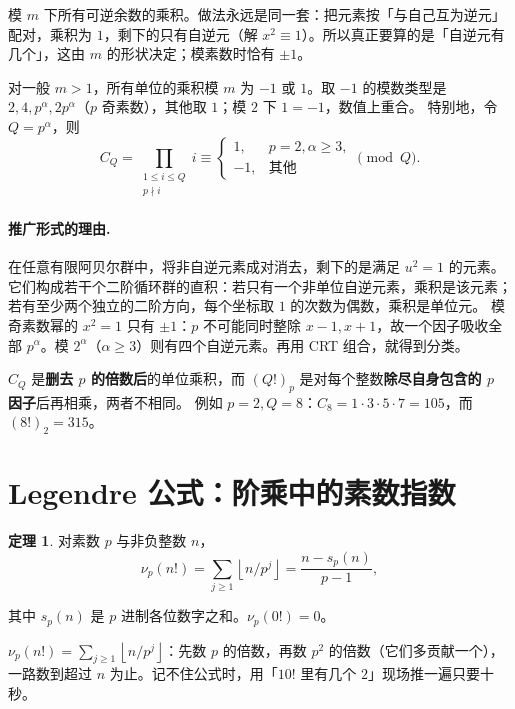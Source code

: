 \documentclass[UTF8,a4paper,11pt,twoside,openright,fontset=fandol]{ctexbook}
\theoremstyle{definition}
\newtheorem{theorem}[definition]{定理}
\newcommand{\floor}[1]{\left\lfloor #1\right\rfloor}
\begin{document}
\begin{tip}
模 $m$ 下所有可逆余数的乘积。做法永远是同一套：把元素按「与自己互为逆元」配对，乘积为 $1$，剩下的只有自逆元（解 $x^2\equiv1$）。所以真正要算的是「自逆元有几个」，这由 $m$ 的形状决定；模素数时恰有 $\pm1$。
\end{tip}

对一般 $m>1$，所有单位的乘积模 $m$ 为 $-1$ 或 $1$。取 $-1$ 的模数类型是 $2,4,p^\alpha,2p^\alpha$（$p$ 奇素数），其他取 $1$；模 $2$ 下 $1=-1$，数值上重合。
特别地，令 $Q=p^\alpha$，则
\[
 C_Q=\prod_{\substack{1\le i\le Q\\p\nmid i}}i\equiv
 \begin{cases}1,&p=2,\alpha\ge3,\\-1,&\text{其他}\end{cases}\pmod Q.
\]


\paragraph{推广形式的理由.}
在任意有限阿贝尔群中，将非自逆元素成对消去，剩下的是满足 $u^2=1$ 的元素。它们构成若干个二阶循环群的直积：若只有一个非单位自逆元素，乘积是该元素；若有至少两个独立的二阶方向，每个坐标取 $1$ 的次数为偶数，乘积是单位元。
模奇素数幂的 $x^2=1$ 只有 $\pm1$：$p$ 不可能同时整除 $x-1,x+1$，故一个因子吸收全部 $p^\alpha$。模 $2^\alpha$（$\alpha\ge3$）则有四个自逆元素。再用 CRT 组合，就得到分类。
\begin{pitfall}
$C_Q$ 是\textbf{删去 $p$ 的倍数后}的单位乘积，而 $(Q!)_p$ 是对每个整数\textbf{除尽自身包含的 $p$ 因子}后再相乘，两者不相同。
例如 $p=2,Q=8$：$C_8=1\cdot3\cdot5\cdot7=105$，而 $(8!)_2=315$。
\end{pitfall}


\section{Legendre 公式：阶乘中的素数指数}
\begin{theorem}
对素数 $p$ 与非负整数 $n$，
\[
 \nu_p(n!)=\sum_{j\ge1}\floor{n/p^j}
 =\frac{n-s_p(n)}{p-1},
\]


其中 $s_p(n)$ 是 $p$ 进制各位数字之和。$\nu_p(0!)=0$。
\end{theorem}

\begin{tip}[一句话版]
$\nu_p(n!)=\sum_{j\ge1}\floor{n/p^j}$：先数 $p$ 的倍数，再数 $p^2$ 的倍数（它们多贡献一个），一路数到超过 $n$ 为止。记不住公式时，用「$10!$ 里有几个 $2$」现场推一遍只要十秒。
\end{tip}
\end{document}

